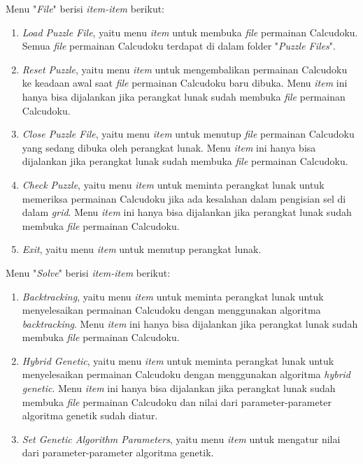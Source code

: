 \documentclass[11pt,a4paper,twoside,openright]{article}
\begin{document}
Menu "\textit{File}" berisi \textit{item-item} berikut:
\begin{enumerate}
\item \textit{Load Puzzle File}, yaitu menu \textit{item} untuk membuka \textit{file} permainan Calcudoku. Semua \textit{file} permainan Calcudoku terdapat di dalam folder "\textit{Puzzle Files}".
\item \textit{Reset Puzzle}, yaitu menu \textit{item} untuk mengembalikan permainan Calcudoku ke keadaan awal saat \textit{file} permainan Calcudoku baru dibuka. Menu \textit{item} ini hanya bisa dijalankan jika perangkat lunak sudah membuka \textit{file} permainan Calcudoku.
\item \textit{Close Puzzle File}, yaitu menu \textit{item} untuk menutup \textit{file} permainan Calcudoku yang sedang dibuka oleh perangkat lunak. Menu \textit{item} ini hanya bisa dijalankan jika perangkat lunak sudah membuka \textit{file} permainan Calcudoku.
\item \textit{Check Puzzle}, yaitu menu \textit{item} untuk meminta perangkat lunak untuk memeriksa permainan Calcudoku jika ada kesalahan dalam pengisian sel di dalam \textit{grid}. Menu \textit{item} ini hanya bisa dijalankan jika perangkat lunak sudah membuka \textit{file} permainan Calcudoku.
\item \textit{Exit}, yaitu menu \textit{item} untuk menutup perangkat lunak.
\end{enumerate}

Menu "\textit{Solve}" berisi \textit{item-item} berikut:
\begin{enumerate}
\item \textit{Backtracking}, yaitu menu \textit{item} untuk meminta perangkat lunak untuk menyelesaikan permainan Calcudoku dengan menggunakan algoritma \textit{backtracking}. Menu \textit{item} ini hanya bisa dijalankan jika perangkat lunak sudah membuka \textit{file} permainan Calcudoku.
\item \textit{Hybrid Genetic}, yaitu menu \textit{item} untuk meminta perangkat lunak untuk menyelesaikan permainan Calcudoku dengan menggunakan algoritma \textit{hybrid genetic}. Menu \textit{item} ini hanya bisa dijalankan jika perangkat lunak sudah membuka \textit{file} permainan Calcudoku dan nilai dari parameter-parameter algoritma genetik sudah diatur.
\item \textit{Set Genetic Algorithm Parameters}, yaitu menu \textit{item} untuk mengatur nilai dari parameter-parameter algoritma genetik.
\end{enumerate}
\end{document}
